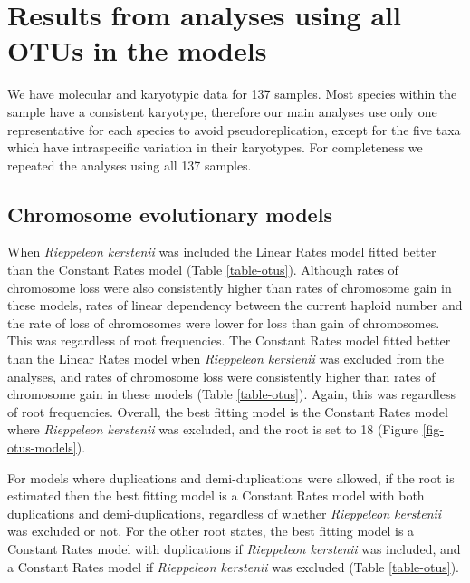 \documentclass[a4paper, 12pt]{article}
\begin{document}
\newpage
\section{Results from analyses using all OTUs in the models}

We have molecular and karyotypic data for 137 samples. Most species within the sample have a consistent karyotype, therefore our main analyses use only one representative for each species to avoid pseudoreplication, except for the five taxa which have intraspecific variation in their karyotypes. For completeness we repeated the analyses using all 137 samples.

\subsection{Chromosome evolutionary models}
When \textit{Rieppeleon kerstenii} was included the Linear Rates model fitted better than the Constant Rates model (Table \ref{table-otus}). Although rates of chromosome loss were also consistently higher than rates of chromosome gain in these models, rates of linear dependency between the current haploid number and the rate of loss of chromosomes were lower for loss than gain of chromosomes. This was regardless of root frequencies. The Constant Rates model fitted better than the Linear Rates model when \textit{Rieppeleon kerstenii} was excluded from the analyses, and rates of chromosome loss were consistently higher than rates of chromosome gain in these models (Table \ref{table-otus}). Again, this was regardless of root frequencies. Overall, the best fitting model is the Constant Rates model where \textit{Rieppeleon kerstenii} was excluded, and the root is set to 18 (Figure \ref{fig-otus-models}). 

\noindent For models where duplications and demi-duplications were allowed, if the root is estimated then the best fitting model is a Constant Rates model with both duplications and demi-duplications, regardless of whether \textit{Rieppeleon kerstenii} was excluded or not. For the other root states, the best fitting model is a Constant Rates model with duplications if \textit{Rieppeleon kerstenii} was included, and a Constant Rates model if \textit{Rieppeleon kerstenii} was excluded (Table \ref{table-otus}). 

\newpage

\end{document}
